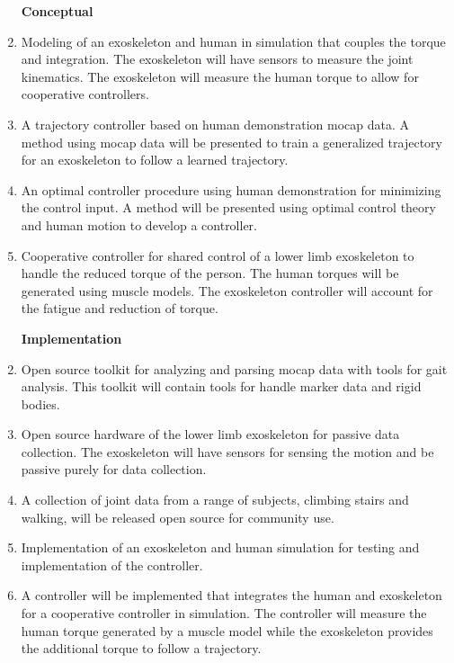 \begin{enumerate}[wide, nosep, labelindent = 0pt, topsep = 1ex]
\item[\textbf{\textbf{Conceptual}}]
    \item  Modeling of an exoskeleton and human in simulation that couples the torque and integration. The exoskeleton will have sensors to measure the joint kinematics. The exoskeleton will measure the human torque to allow for cooperative controllers.  
    \item A trajectory controller based on human demonstration mocap data. A method using mocap data will be presented to train a generalized trajectory for an exoskeleton to follow a learned trajectory. 
    \item An optimal controller procedure using human demonstration for minimizing the control input. A method will be presented using optimal control theory and human motion to develop a controller. 
    \item Cooperative controller for shared control of a lower limb exoskeleton to handle the reduced torque of the person. The human torques will be generated using muscle models. The exoskeleton controller will account for the fatigue and reduction of torque. 
\end{enumerate}


\begin{enumerate}[wide, nosep, labelindent = 0pt, topsep = 1ex]
\item[\textbf{\textbf{Implementation}}]
    \item Open source toolkit for analyzing and parsing mocap data with tools for gait analysis. This toolkit will contain tools for handle marker data and rigid bodies.  
    \item Open source hardware of the lower limb exoskeleton for passive data collection. The exoskeleton will have sensors for sensing the motion and be passive purely for data collection.
    \item A collection of joint data from a range of subjects, climbing stairs and walking, will be released open source for community use.  
    \item Implementation of an exoskeleton and human simulation for testing and implementation of the controller.
    \item A controller will be implemented that integrates the human and exoskeleton for a cooperative controller in simulation. The controller will measure the human torque generated by a muscle model while the exoskeleton provides the additional torque to follow a trajectory.  
\end{enumerate}